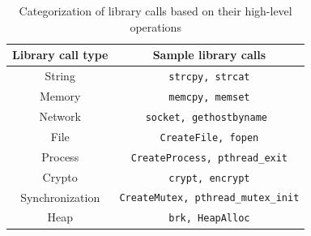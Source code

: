 \begin{table}[t]
\caption{Categorization of library calls based on their high-level operations}\label{tab:lib-cat}
\begin{center}
{\scriptsize
\begin{tabular}{|c|c|}
  \hline
  \textbf{Library call type} & \textbf{Sample library calls} \\
  \hline
  String & \texttt{strcpy, strcat}\\
  \hline
  Memory  & \texttt{memcpy, memset} \\
  \hline
  Network & \texttt{socket, gethostbyname }\\
  \hline
   File & \texttt{CreateFile, fopen}\\
  \hline
  Process  & \texttt{CreateProcess, pthread\_exit} \\
  \hline
 Crypto & \texttt{crypt, encrypt}\\
  \hline
  Synchronization  & \texttt{CreateMutex, pthread\_mutex\_init} \\
  \hline
  Heap & \texttt{brk, HeapAlloc}\\
  \hline
  \end{tabular}
}
\end{center}
\end{table}


